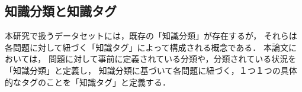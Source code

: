 %

\subsection{知識分類と知識タグ}
本研究で扱うデータセットには，既存の「知識分類」が存在するが，
それらは各問題に対して紐づく「知識タグ」によって構成される概念である．
本論文においては，
問題に対して事前に定義されている分類や，分類されている状況を「知識分類」と定義し，
知識分類に基づいて各問題に紐づく，１つ１つの具体的なタグのことを「知識タグ」と定義する．

